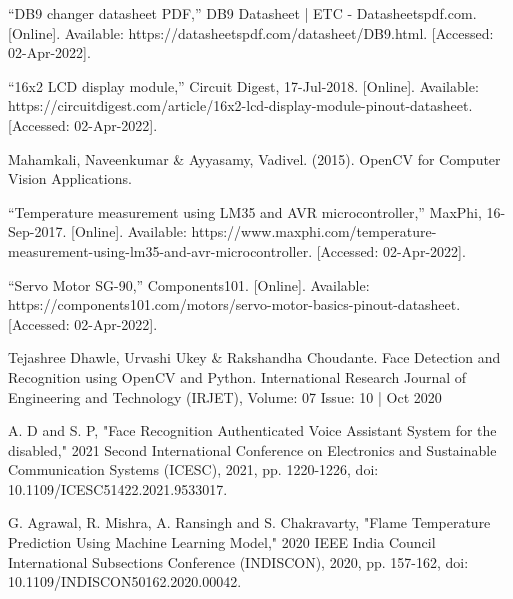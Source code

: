 \documentclass[conference]{IEEEtran}
\begin{document}
\begin{thebibliography}{1}
		“DB9 changer datasheet PDF,” DB9 Datasheet | ETC - Datasheetspdf.com. [Online]. Available: https://datasheetspdf.com/datasheet/DB9.html. [Accessed: 02-Apr-2022].
		
		“16x2 LCD display module,” Circuit Digest, 17-Jul-2018. [Online]. Available: https://circuitdigest.com/article/16x2-lcd-display-module-pinout-datasheet. [Accessed: 02-Apr-2022].
		
		Mahamkali, Naveenkumar \& Ayyasamy, Vadivel. (2015). OpenCV for Computer Vision Applications. 
		
		
		
		“Temperature measurement using LM35 and AVR microcontroller,” MaxPhi, 16-Sep-2017. [Online]. Available: https://www.maxphi.com/temperature-measurement-using-lm35-and-avr-microcontroller. [Accessed: 02-Apr-2022]. 
		
		“Servo Motor SG-90,” Components101. [Online]. Available: https://components101.com/motors/servo-motor-basics-pinout-datasheet. [Accessed: 02-Apr-2022].
		
		Tejashree Dhawle, Urvashi Ukey \& Rakshandha Choudante. Face Detection and Recognition using OpenCV and Python. International Research Journal of Engineering and Technology (IRJET), Volume: 07 Issue: 10 | Oct 2020
		
		A. D and S. P, "Face Recognition Authenticated Voice Assistant System for the disabled," 2021 Second International Conference on Electronics and Sustainable Communication Systems (ICESC), 2021, pp. 1220-1226, doi: 10.1109/ICESC51422.2021.9533017.
		
		G. Agrawal, R. Mishra, A. Ransingh and S. Chakravarty, "Flame Temperature Prediction Using Machine Learning Model," 2020 IEEE India Council International Subsections Conference (INDISCON), 2020, pp. 157-162, doi: 10.1109/INDISCON50162.2020.00042.
		
		
		
		
		
		
		
		
		
	\end{thebibliography}
\end{document}
